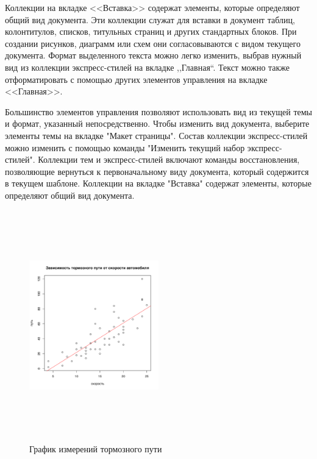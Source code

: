 \documentclass{article}
\begin{document}
Коллекции на вкладке <<Вставка>> содержат элементы, которые определяют общий вид документа. Эти коллекции служат для вставки в документ таблиц, колонтитулов, списков, титульных страниц и других стандартных блоков. При создании рисунков, диаграмм или схем они согласовываются с видом текущего документа. Формат выделенного текста можно легко изменить, выбрав нужный вид из коллекции экспресс-стилей на вкладке ,,Главная``. Текст можно также отформатировать с помощью других элементов управления на вкладке <<Главная>>.






Большинство элементов управления позволяют использовать вид из текущей темы и формат, указанный непосредственно. Чтобы изменить вид документа, выберите элементы темы на вкладке "Макет страницы". Состав коллекции экспресс-стилей можно изменить с помощью команды "Изменить текущий набор экспресс-стилей". Коллекции тем и экспресс-стилей включают команды восстановления, позволяющие вернуться к первоначальному виду документа, который содержится в текущем шаблоне. Коллекции на вкладке "Вставка" содержат элементы, которые определяют общий вид документа.

\begin{figure}[h]
\centering
\includegraphics[height=10cm,width=0.5\textwidth,keepaspectratio,%
	trim=0 0.5cm 0 1.5cm,clip%
	]{plot_cars_distance}
\caption{График измерений тормозного пути}
\label{fig:plot_cars_distance}
\end{figure}
\end{document}
